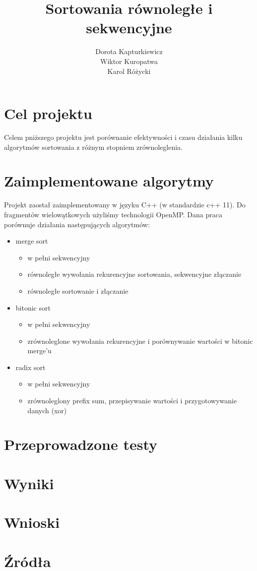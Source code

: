 \documentclass[11pt]{article}
\title{\textbf{Sortowania równoległe i sekwencyjne}}
\author{Dorota Kapturkiewicz\\
		Wiktor Kuropatwa\\
		Karol Różycki}
\date{}
\begin{document}
\maketitle

\section{Cel projektu}
Celem pniższego projektu jest porównanie efektywności i czasu działania kilku algorytmów sortowania z różnym stopniem zrównoleglenia.

\section{Zaimplementowane algorytmy}
Projekt zaostał zaimplementowany w języku C++ (w standardzie c++ 11).
Do fragmentów wielowątkowych użyliśmy technologii OpenMP. \newline
Dana praca porównuje działania następujących algorytmów:
\begin{itemize}

\item merge sort 
\begin{itemize}
\item w pełni sekwencyjny 
\item równoległe wywołania rekurencyjne sortowania, sekwencyjne złączanie
\item równoległe sortowanie i złączanie
\end{itemize}

\item bitonic sort
\begin{itemize}
\item w pełni sekwencyjny 
\item zrównoleglone wywołania rekurencyjne i porównywanie wartości w bitonic merge'u
\end{itemize}

\item radix sort
\begin{itemize}
\item w pełni sekwencyjny 
\item zrównoleglony prefix sum, przepisywanie wartości i przygotowywanie danych (xor)
\end{itemize}

\end{itemize}


\section{Przeprowadzone testy}


\section{Wyniki}

\section{Wnioski}

\section{Źródła}
\end{document}
